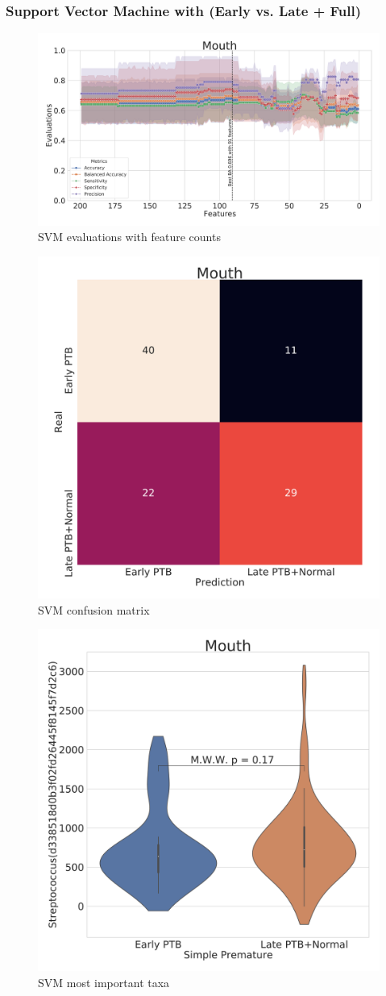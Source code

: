 \documentclass{beamer}
\begin{document}
    \begin{frame}[allowframebreaks]
        \frametitle{Support Vector Machine with (Early vs. Late + Full)}

        \begin{figure}
            \includegraphics[width=0.8 \linewidth]{figures/SVM/SVM-two.DADA2.homd/Mouth+metrics.pdf}
            \caption{SVM evaluations with feature counts}
        \end{figure}

        \begin{figure}
            \includegraphics[width=0.5 \linewidth]{figures/SVM/SVM-two.DADA2.homd/Mouth+heatmap.pdf}
            \caption{SVM confusion matrix}
        \end{figure}

        \begin{figure}
            \includegraphics[width=0.5 \linewidth]{figures/SVM/SVM-two.DADA2.homd/Mouth+Violin_0.pdf}
            \caption{SVM most important taxa}
        \end{figure}
    \end{frame}
\end{document}
